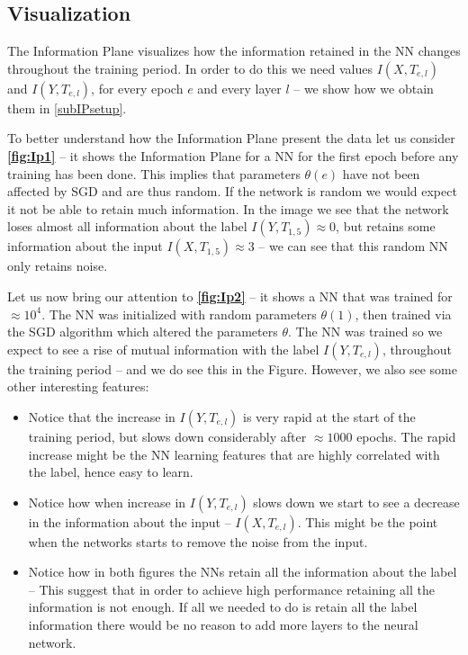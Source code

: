 \documentclass[dissertation.tex]{subfiles}
\begin{document}
\subsection{Visualization}\label{subVIZ}

The Information Plane visualizes how the information retained in the NN changes
throughout the training period. 
In order to do this we need values $I(X,T_{e,l})$ and $I(Y,T_{e,l})$, for every
epoch $e$ and every layer $l$ -- we show how we obtain them in
\autoref{subIPsetup}.

To better understand how the Information Plane present the data let us consider
\textbf{\autoref{fig:Ip1}} -- it shows the Information Plane for a NN for the
first epoch before any training has been done. This implies that parameters
$\theta(e)$ have not been affected by SGD and are thus random. If the network is
random we would expect it not be able to retain much information.  In the image
we see that the network loses almost all information about the label $I(Y,
T_{1,5}) \approx 0$, but retains some information about the input $I(X, T_{1,5})
\approx 3$ -- we can see that this random NN only retains noise.

Let us now bring our attention to \textbf{\autoref{fig:Ip2}} -- it shows a NN
that was trained for $\approx{10^4}$. The NN was initialized with random
parameters $\theta(1)$, then trained via the SGD algorithm which altered the
parameters $\theta$. The NN was trained so we expect to see a rise of mutual
information with the label $I(Y, T_{e, l})$, throughout the training period --
and we do see this in the Figure. However, we also see some other interesting
features:
\begin{itemize}
  \item{
      Notice that the increase in $I(Y,T_{e,l})$ is very rapid at the start of
      the training period, but slows down considerably after $\approx 1000$
      epochs. The rapid increase might be the NN learning features that are
      highly correlated with the label, hence easy to learn.
    }
  \item{
      Notice how when increase in $I(Y,T_{e,l})$ slows down we start to see a
      decrease in the information about the input -- $I(X,T_{e,l})$. This might
      be the point when the networks starts to remove the noise from the input.
    }
  \item{
      Notice how in both figures the NNs retain all the information about the
      label -- This suggest that in order to achieve high performance retaining
      all the information is not enough. If all we needed to do is retain all
      the label information there would be no reason to add more layers to the
      neural network.
    }
\end{itemize}
\end{document}
